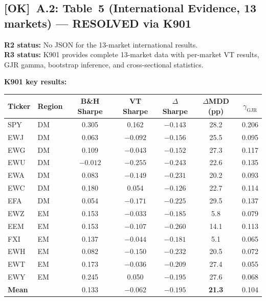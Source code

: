 \documentclass[12pt,a4paper]{article}
\newcommand{\OK}{\textcolor{okgreen}{\textbf{[OK]}}}
\begin{document}
\subsection{\OK\ A.2: Table~5 (International Evidence, 13 markets) --- RESOLVED via K901}

\textbf{R2 status:} No JSON for the 13-market international results.\\
\textbf{R3 status:} \textcolor{okgreen}{K901 provides complete 13-market data with per-market VT results, GJR gamma, bootstrap inference, and cross-sectional statistics.}

\medskip
\noindent\textbf{K901 key results:}

\begin{center}
\small
\begin{tabular}{llccccc}
\toprule
Ticker & Region & B\&H Sharpe & VT Sharpe & $\Delta$Sharpe & $\Delta$MDD (pp) & $\gamma_{\text{GJR}}$ \\
\midrule
SPY & DM & 0.305 & 0.162 & $-0.143$ & 28.2 & 0.206 \\
EWJ & DM & 0.063 & $-0.092$ & $-0.156$ & 25.5 & 0.095 \\
EWG & DM & 0.109 & $-0.043$ & $-0.152$ & 27.3 & 0.117 \\
EWU & DM & $-0.012$ & $-0.255$ & $-0.243$ & 22.6 & 0.135 \\
EWA & DM & 0.083 & $-0.149$ & $-0.231$ & 20.2 & 0.093 \\
EWC & DM & 0.180 & 0.054 & $-0.126$ & 22.7 & 0.114 \\
EFA & DM & 0.054 & $-0.171$ & $-0.225$ & 29.5 & 0.137 \\
EWZ & EM & 0.153 & $-0.033$ & $-0.185$ & 5.8 & 0.079 \\
EEM & EM & 0.153 & $-0.107$ & $-0.260$ & 14.1 & 0.113 \\
FXI & EM & 0.137 & $-0.044$ & $-0.181$ & 5.1 & 0.065 \\
EWH & EM & 0.082 & $-0.150$ & $-0.232$ & 20.5 & 0.072 \\
EWT & EM & 0.173 & $-0.036$ & $-0.209$ & 27.4 & 0.055 \\
EWY & EM & 0.245 & 0.050 & $-0.195$ & 27.6 & 0.068 \\
\midrule
\textbf{Mean} & & 0.133 & $-0.062$ & $-0.195$ & \textbf{21.3} & 0.104 \\
\bottomrule
\end{tabular}
\end{center}
\end{document}
